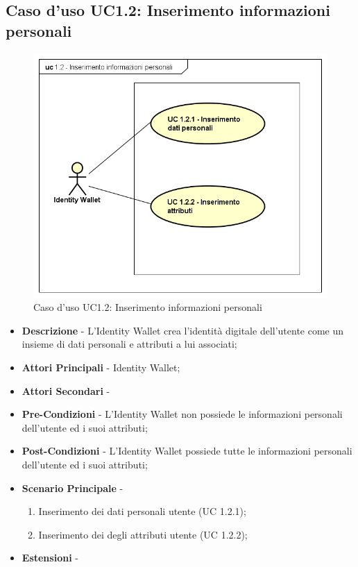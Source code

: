 \subsection{Caso d'uso UC1.2: Inserimento informazioni personali}
\begin{figure}[h]
	\centering
	\includegraphics[scale=0.50]{immagini/usecase/UC12_InserimentoInformazioniPersonalii}
	\caption{Caso d'uso UC1.2: Inserimento informazioni personali}
\end{figure}
\begin{itemize}
	\item \textbf{Descrizione} - L'Identity Wallet crea l'identità digitale dell'utente come un insieme di dati personali e attributi a lui associati;
	\item \textbf{Attori Principali} - Identity Wallet;
	\item \textbf{Attori Secondari} -
	\item \textbf{Pre-Condizioni} - L'Identity Wallet non possiede le informazioni personali dell'utente ed i suoi attributi;
	\item \textbf{Post-Condizioni} - L'Identity Wallet possiede tutte le informazioni personali dell'utente ed i suoi attributi;
	\item \textbf{Scenario Principale} -
	\begin{enumerate}
		\item Inserimento dei dati personali utente (UC 1.2.1);
		\item Inserimento dei degli attributi utente (UC 1.2.2);
	\end{enumerate}
	\item \textbf{Estensioni} -
\end{itemize}
\newpage
